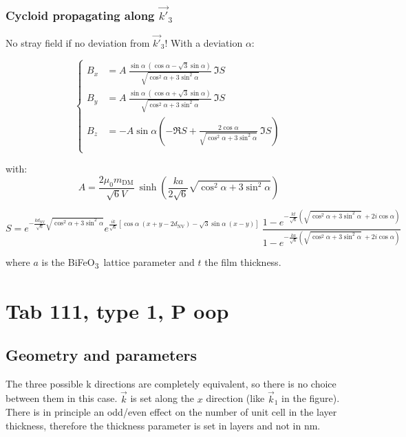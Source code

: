 \documentclass[a4paper,12pt]{article}
\newcommand{\BFO}{BiFeO\textsubscript{3}\ }
\begin{document}
  \subsubsection{Cycloid propagating along $\vec{k'}_3$}
  No stray field if no deviation from $\vec{k'}_3$! With a deviation $\alpha$:

  \begin{equation*}
  \left \lbrace
    \begin{aligned}
      B_x & =  A \ \frac{\sin \alpha \ (\cos \alpha - \sqrt{3} \sin \alpha)}{\sqrt{\cos^2 \alpha + 3 \sin^2 \alpha}} \ \Im{S}\\
      B_y &=    A \ \frac{\sin \alpha \ (\cos \alpha + \sqrt{3} \sin \alpha)}{\sqrt{\cos^2 \alpha + 3 \sin^2 \alpha}} \ \Im{S}\\
      B_z & =  -A \sin \alpha \left( -\Re{S} + \frac{2 \cos \alpha}{\sqrt{\cos^2 \alpha + 3 \sin^2 \alpha}} \ \Im{S} \right)\\
     \end{aligned}
   \right.
 \end{equation*}

 \vspace*{5mm}
 
 with:
 \[A = \frac{2\mu_0 m_\text{DM}}{\sqrt{6} V} \ \sinh \left(\frac{ka}{2\sqrt{6}} \sqrt{\cos^2 \alpha + 3 \sin^2 \alpha}\right) \]

 \[ S = e^{-\frac{kd_\text{NV}}{\sqrt{6}} \sqrt{\cos^2 \alpha + 3 \sin^2 \alpha}} e^{\frac{ik}{\sqrt{6}}[\cos \alpha \ (x+y-2d_\text{NV}) - \sqrt{3} \sin \alpha \ (x-y)]}   \        \frac{1-e^{-\frac{kt}{\sqrt{6}} (\sqrt{\cos^2 \alpha + 3 \sin^2 \alpha} \ +2i \cos \alpha) }}{1-e^{-\frac{ka}{\sqrt{6}} (\sqrt{\cos^2 \alpha + 3 \sin^2 \alpha} \ +2i \cos \alpha)}} \]

  where $a$ is the \BFO lattice parameter and $t$ the film thickness.
  
\clearpage
\section{Tab 111, type 1, P oop}
\subsection{Geometry and parameters}

The three possible k directions are completely equivalent, so there is no choice between them in this case. $\vec{k}$ is set along the $x$ direction (like $\vec{k}_1$ in the figure). There is in principle an odd/even effect on the number of unit cell in the layer thickness, therefore the thickness parameter is set in layers and not in \si{\nano\meter}.
\end{document}
